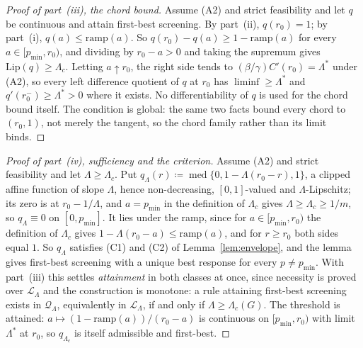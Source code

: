 \documentclass[acmsmall,nonacm,screen]{acmart}
\theoremstyle{acmplain}%
\theoremstyle{acmdefinition}%
\numberwithin{equation}{section}
\begin{document}
\begin{appendix}
\begin{proof}[Proof of part~(iii), the chord bound]
Assume (A2) and strict feasibility and let $q$ be continuous and attain first-best screening. By part~(ii), $q(r_0)=1$; by part~(i), $q(a)\leq\mathrm{ramp}(a)$. So $q(r_0)-q(a)\geq1-\mathrm{ramp}(a)$ for every $a\in[p_{\min},r_0)$, and dividing by $r_0-a>0$ and taking the supremum gives $\mathrm{Lip}(q)\geq\Lambda_c$. Letting $a\uparrow r_0$, the right side tends to $(\beta/\gamma)C'(r_0)=\Lambda^*$ under (A2), so every left difference quotient of $q$ at $r_0$ has $\liminf\geq\Lambda^*$ and $q'(r_0^-)\geq\Lambda^*>0$ where it exists. No differentiability of $q$ is used for the chord bound itself. The condition is global: the same two facts bound every chord to $(r_0,1)$, not merely the tangent, so the chord family rather than its limit binds.
\end{proof}

\begin{proof}[Proof of part~(iv), sufficiency and the criterion]
Assume (A2) and strict feasibility and let $\Lambda\geq\Lambda_c$. Put $q_\Lambda(r)\coloneqq\operatorname{med}\{0,1-\Lambda(r_0-r),1\}$, a clipped affine function of slope $\Lambda$, hence non-decreasing, $[0,1]$-valued and $\Lambda$-Lipschitz; its zero is at $r_0-1/\Lambda$, and $a=p_{\min}$ in the definition of $\Lambda_c$ gives $\Lambda\geq\Lambda_c\geq1/m$, so $q_\Lambda\equiv0$ on $[0,p_{\min}]$. It lies under the ramp, since for $a\in[p_{\min},r_0)$ the definition of $\Lambda_c$ gives $1-\Lambda(r_0-a)\leq\mathrm{ramp}(a)$, and for $r\geq r_0$ both sides equal $1$. So $q_\Lambda$ satisfies (C1) and (C2) of Lemma~\ref{lem:envelope}, and the lemma gives first-best screening with a unique best response for every $p\neq p_{\min}$. With part~(iii) this settles \emph{attainment} in both classes at once, since necessity is proved over $\mathcal{L}_\Lambda$ and the construction is monotone: a rule attaining first-best screening exists in $\mathcal{Q}_\Lambda$, equivalently in $\mathcal{L}_\Lambda$, if and only if $\Lambda\geq\Lambda_c(G)$. The threshold is attained: $a\mapsto(1-\mathrm{ramp}(a))/(r_0-a)$ is continuous on $[p_{\min},r_0)$ with limit $\Lambda^*$ at $r_0$, so $q_{\Lambda_c}$ is itself admissible and first-best.


\end{proof}
\end{appendix}
\end{document}
